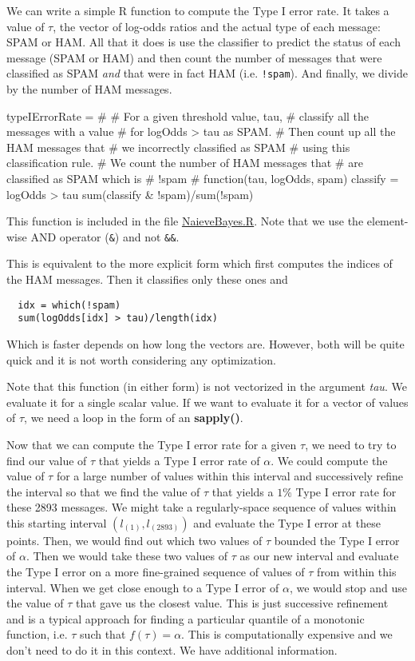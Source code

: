 \documentclass{article}
\def\SFunction#1{\textbf{#1()}}
\def\SArg#1{\textsl{#1}}
\def\HREF#1#2{\href{#1}{#2}}
\begin{document}
We can write a simple R function to compute the Type I error rate.  It
takes a value of $\tau$, the vector of log-odds ratios and the actual
type of each message: SPAM or HAM.  All that it does is use the
classifier to predict the status of each message (SPAM or HAM) and
then count the number of messages that were classified as SPAM
\textit{and} that were in fact HAM (i.e. \verb+!spam+).  And finally,
we divide by the number of HAM messages.
\begin{listing}[5]{1}
typeIErrorRate =
  #
  # For a given threshold value, tau, 
  # classify all the messages with a value
  # for logOdds > tau as SPAM.
  # Then count up all the HAM messages that
  # we incorrectly classified as SPAM
  # using this classification rule.
  # We count the number of HAM messages that
  # are classified as SPAM which is 
  # !spam
  #
function(tau, logOdds, spam)
{
  classify = logOdds > tau
  sum(classify & !spam)/sum(!spam)
}
\end{listing}
This function is included in the file
\HREF{NaiveBayes.R}{NaieveBayes.R}.  Note that we use the element-wise
AND operator (\texttt{\&}) and not \texttt{\&\&}.

This is equivalent to the more explicit form which first computes the
indices of the HAM messages.  Then it classifies only these ones and
\begin{verbatim}
  idx = which(!spam)
  sum(logOdds[idx] > tau)/length(idx)
\end{verbatim}
Which is faster depends on how long the vectors are. However, both
will be quite quick and it is not worth considering any optimization.

Note that this function (in either form) is not vectorized in the
argument \SArg{tau}.  We evaluate it for a single scalar value.  If we
want to evaluate it for a vector of values of $\tau$, we need a loop
in the form of an \SFunction{sapply}.


Now that we can compute the Type I error rate for a given $\tau$, we
need to try to find our value of $\tau$ that yields a Type I error
rate of $\alpha$.  We could compute the value of $\tau$ for a large
number of values within this interval and successively refine the
interval so that we find the value of $\tau$ that yields a $1\%$ Type
I error rate for these 2893 messages.  We might take a regularly-space
sequence of values within this starting interval $(l_{(1)},
l_{(2893)})$ and evaluate the Type I error at these points.  Then, we
would find out which two values of $\tau$ bounded the Type I error of
$\alpha$.  Then we would take these two values of $\tau$ as our new
interval and evaluate the Type I error on a more fine-grained sequence
of values of $\tau$ from within this interval.  When we get close
enough to a Type I error of $\alpha$, we would stop and use the value
of $\tau$ that gave us the closest value.  This is just successive
refinement and is a typical approach for finding a particular quantile
of a monotonic function, i.e. $\tau$ such that $f(\tau) = \alpha$.
This is computationally expensive and we don't need to do it in this
context.  We have additional information.
\end{document}
